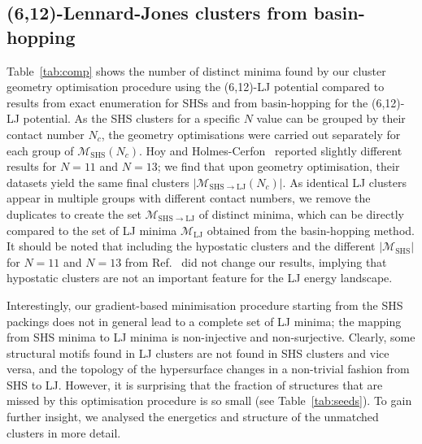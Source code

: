 \subsection{(6,12)-Lennard-Jones clusters from basin-hopping} 
\label{sec:612LennardJonesClustersfromBasinHopping}

Table~\ref{tab:comp} shows the number of distinct minima found by our cluster
geometry optimisation procedure using the (6,12)-LJ potential compared to
results from exact enumeration for \ac{SHS}s and from basin-hopping for the (6,12)-LJ
potential.  As the \ac{SHS} clusters for a specific $N$ value can be grouped by
their contact number $N_c$, the geometry optimisations were carried out
separately for each group of $\mathcal{M}_\mathrm{SHS}(N_c)$. Hoy
\autocite{Hoy_Structurefinitesphere_2012,Hoy_Structuredynamicsmodel_2015} and Holmes-Cerfon~\autocite{Holmes-Cerfon_EnumeratingRigidSphere_2016}  reported
slightly different results
for $N=11$ and $N=13$; we find that upon geometry optimisation,
their datasets yield the same final clusters
$|\mathcal{M}_{\mathrm{SHS\to LJ}}(N_c)|$.  As identical LJ clusters appear in
multiple groups with different contact numbers, we remove the duplicates to
create the set $\mathcal{M}_\mathrm{SHS\to LJ}$ of distinct minima, which can
be directly compared to the set of LJ minima $\mathcal{M}_\mathrm{LJ}$ obtained
from the basin-hopping method. It should be noted that including the hypostatic
clusters and the different $|\mathcal{M}_\mathrm{SHS}|$ for $N=11$ and $N=13$
from Ref.~\autocite{Holmes-Cerfon_EnumeratingRigidSphere_2016} did not change our results, implying that hypostatic
clusters are not an important feature for the LJ energy landscape. 


Interestingly, our gradient-based minimisation procedure starting from the \ac{SHS}
packings does not in general lead to a complete set of LJ minima; the mapping
from \ac{SHS} minima to LJ minima is non-injective and non-surjective.  Clearly,
some structural motifs found in LJ clusters are not found in \ac{SHS} clusters and
vice versa, and the topology of the hypersurface changes in a non-trivial
fashion from \ac{SHS} to LJ.  However, it is surprising that the fraction of
structures that are missed by this optimisation procedure is so small (see
Table~\ref{tab:seeds}). To gain further insight, we analysed the energetics and
structure of the unmatched clusters in more detail.

